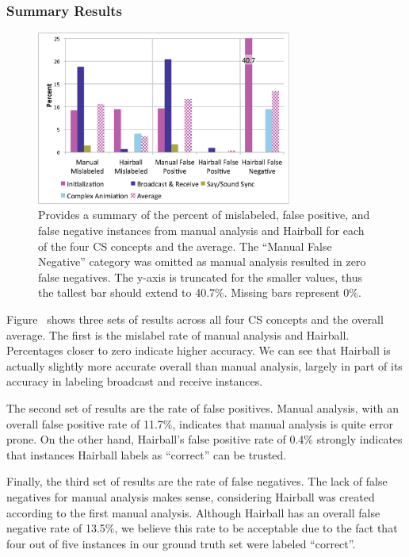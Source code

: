 \subsubsection{Summary Results}
\begin{figure}[!t]
\centering \includegraphics[trim=.3in .15in .3in .15in, clip,
  width=3.3in]{graphs/AutoSummary.eps}
\caption{Provides a summary of the percent of mislabeled, false positive, and
  false negative instances from manual analysis and Hairball for each of the
  four CS concepts and the average. The ``Manual False Negative'' category was
  omitted as manual analysis resulted in zero false negatives. The y-axis is
  truncated for the smaller values, thus the tallest bar should extend to
  40.7\%. Missing bars represent 0\%.}
\end{figure}

Figure~ shows three sets of results across all four CS
concepts and the overall average. The first is the mislabel rate of manual
analysis and Hairball. Percentages closer to zero indicate higher accuracy. We
can see that Hairball is actually slightly more accurate overall than manual
analysis, largely in part of its accuracy in labeling broadcast and receive
instances.

The second set of results are the rate of false positives. Manual analysis,
with an overall false positive rate of 11.7\%, indicates that manual analysis
is quite error prone. On the other hand, Hairball's false positive rate of
0.4\% strongly indicates that instances Hairball labels as ``correct'' can be
trusted.

Finally, the third set of results are the rate of false negatives. The lack of
false negatives for manual analysis makes sense, considering Hairball was
created according to the first manual analysis. Although Hairball has an
overall false negative rate of 13.5\%, we believe this rate to be acceptable
due to the fact that four out of five instances in our ground truth set were
labeled ``correct''.
